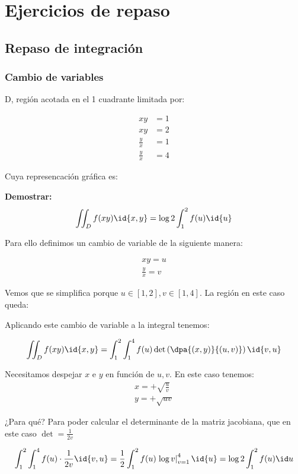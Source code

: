 \section{Ejercicios de repaso}
\subsection{Repaso de integración}
\subsubsection{Cambio de variables}

D, región acotada en el 1 cuadrante limitada por:

\[\begin{array}{cc}
xy&=1\\xy&=2\\\frac{y}{x} &=1\\\frac{y}{x}&=4
\end{array}\]

Cuya represencación gráfica es:


\textbf{Demostrar:}\[\iint_D f(xy)\id{x,y} = \log 2 \int_1^2f(u)\id{u}\]

Para ello definimos un cambio de variable de la siguiente manera:

\begin{gather*}
xy=u\\
\frac{y}{x}=v
\end{gather*}

Vemos que se simplifica porque $u\in[1,2],v\in[1,4]$. La región en este caso queda:


Aplicando este cambio de variable a la integral tenemos:

\[\iint_D f(xy)\id{x,y} = \int_1^2\int_1^4 f(u) \det \left(\dpa{(x,y)}{(u,v)}\right)\id{v,u}\]

Necesitamos despejar $x$ e $y$ en función de $u,v$. En este caso tenemos:
\begin{gather*}
x=+\sqrt{\frac{u}{v}}\\ y= + \sqrt{uv}
\end{gather*}

¿Para qué? Para poder calcular el determinante de la matriz jacobiana, que en este caso $\displaystyle\det = \frac{1}{2v}$

\[\int_1^2\int_1^4 f(u)\cdot  \frac{1}{2v}\id{v,u} = \frac{1}{2} \int_1^2 f(u) \left.\log v\right|_{v=1}^4 \id{u} = \log 2 \int_1^2 f(u) \id u \]

